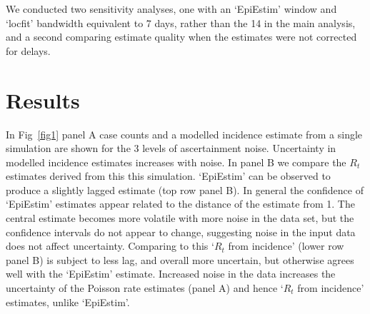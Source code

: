 \documentclass[10pt,letterpaper]{article}
\begin{document}
We conducted two sensitivity analyses, one with an `EpiEstim' window and `locfit' bandwidth equivalent to 7 days, rather than the 14 in the main analysis, and a second comparing estimate quality when the estimates were not corrected for delays.



\section*{Results}

In Fig~\ref{fig1} panel A case counts and a modelled incidence estimate from a single simulation are shown for the 3 levels of ascertainment noise. Uncertainty in modelled incidence estimates increases with noise. In panel B we compare the $R_t$ estimates derived from this this simulation. `EpiEstim' can be observed to produce a slightly lagged estimate (top row panel B). In general the confidence of `EpiEstim' estimates appear related to the distance of the estimate from 1. The central estimate becomes more volatile with more noise in the data set, but the confidence intervals do not appear to change, suggesting noise in the input data does not affect uncertainty. Comparing to this `$R_t$ from incidence' (lower row panel B) is subject to less lag, and overall more uncertain, but otherwise agrees well with the `EpiEstim' estimate. Increased noise in the data increases the uncertainty of the Poisson rate estimates (panel A) and hence `$R_t$ from incidence' estimates, unlike `EpiEstim'.
\end{document}
